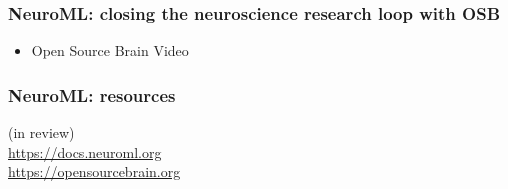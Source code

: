 \begin{frame}[c]
  \frametitle{NeuroML: closing the neuroscience research loop with OSB}
  \begin{itemize}
    \item Open Source Brain Video
  \end{itemize}
\end{frame}
\begin{frame}[c]
  \frametitle{NeuroML: resources}
  \begin{center}
    (in review)\\\vspace{1cm}
    \Large{\url{https://docs.neuroml.org}}\\
    \Large{\url{https://opensourcebrain.org}}
  \end{center}
\end{frame}

